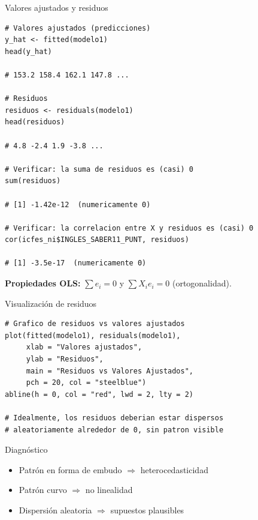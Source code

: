 \documentclass[aspectratio=169, 11pt]{beamer}
\begin{document}
\begin{frame}[fragile]{Valores ajustados y residuos}
\begin{lstlisting}[basicstyle=\ttfamily\scriptsize,aboveskip=0pt,belowskip=0pt]
# Valores ajustados (predicciones)
y_hat <- fitted(modelo1)
head(y_hat)

# 153.2 158.4 162.1 147.8 ...

# Residuos
residuos <- residuals(modelo1)
head(residuos)

# 4.8 -2.4 1.9 -3.8 ...

# Verificar: la suma de residuos es (casi) 0
sum(residuos)

# [1] -1.42e-12  (numericamente 0)

# Verificar: la correlacion entre X y residuos es (casi) 0
cor(icfes_ni$INGLES_SABER11_PUNT, residuos)

# [1] -3.5e-17  (numericamente 0)
\end{lstlisting}

{\small \textbf{Propiedades OLS:} $\sum e_i = 0$ y $\sum X_i e_i = 0$ (ortogonalidad).}
\end{frame}

\begin{frame}[fragile]{Visualización de residuos}
\begin{lstlisting}
# Grafico de residuos vs valores ajustados
plot(fitted(modelo1), residuals(modelo1),
     xlab = "Valores ajustados",
     ylab = "Residuos",
     main = "Residuos vs Valores Ajustados",
     pch = 20, col = "steelblue")
abline(h = 0, col = "red", lwd = 2, lty = 2)

# Idealmente, los residuos deberian estar dispersos
# aleatoriamente alrededor de 0, sin patron visible
\end{lstlisting}

\vspace{0.2cm}
\begin{block}{Diagnóstico}
\begin{itemize}
  \item Patrón en forma de embudo $\Rightarrow$ heterocedasticidad
  \item Patrón curvo $\Rightarrow$ no linealidad
  \item Dispersión aleatoria $\Rightarrow$ supuestos plausibles
\end{itemize}
\end{block}
\end{frame}

\end{document}
